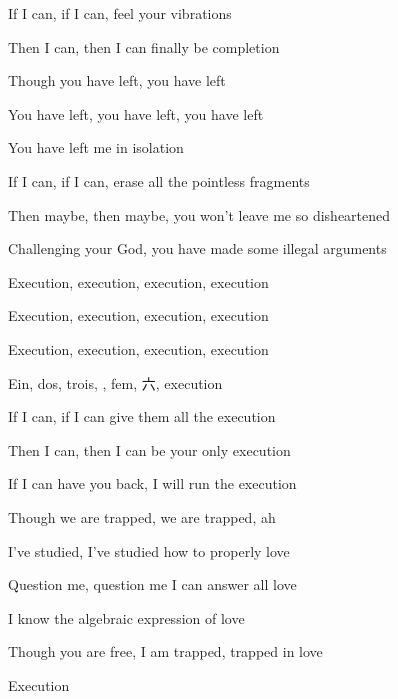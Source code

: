 If I can, if I can, feel your vibrations

Then I can, then I can finally be completion

Though you have left, you have left

You have left, you have left, you have left

You have left me in isolation

\bigskip

If I can, if I can, erase all the pointless fragments

Then maybe, then maybe, you won't leave me so disheartened

Challenging your God, you have made some illegal arguments

\bigskip

Execution, execution, execution, execution

Execution, execution, execution, execution

Execution, execution, execution, execution

{\fontcn Ein, dos, trois, , fem, 六, execution}

\bigskip

If I can, if I can give them all the execution

Then I can, then I can be your only execution

If I can have you back, I will run the execution

Though we are trapped, we are trapped, ah

\bigskip

I've studied, I've studied how to properly love

Question me, question me I can answer all love

I know the algebraic expression of love

Though you are free, I am trapped, trapped in love

\bigskip

Execution
